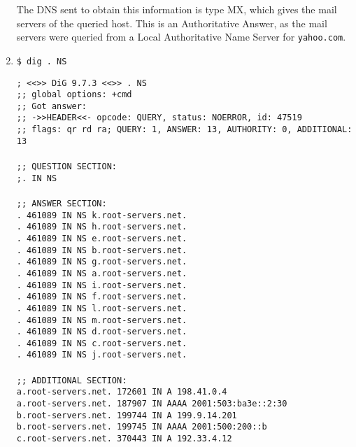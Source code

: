 \documentclass[a4paper,11pt]{article}
\newcommand{\code}{\texttt}
\begin{document}
\begin{enumerate}[leftmargin=*]
	The DNS sent to obtain this information is type MX, which gives the mail servers of the queried host. This is an Authoritative Answer, as the mail servers were queried from a Local Authoritative Name Server for \code{yahoo.com}.

	\item \code{\$ dig . NS}

	\code{; <<>> DiG 9.7.3 <<>> . NS\\
	;; global options: +cmd\\
	;; Got answer:\\
	;; ->>HEADER<<- opcode: QUERY, status: NOERROR, id: 47519\\
	;; flags: qr rd ra; QUERY: 1, ANSWER: 13, AUTHORITY: 0, ADDITIONAL: 13\\
	\\
	;; QUESTION SECTION:\\
	;.				IN	NS\\
	\\
	;; ANSWER SECTION:\\
	.			461089	IN	NS	k.root-servers.net.\\
	.			461089	IN	NS	h.root-servers.net.\\
	.			461089	IN	NS	e.root-servers.net.\\
	.			461089	IN	NS	b.root-servers.net.\\
	.			461089	IN	NS	g.root-servers.net.\\
	.			461089	IN	NS	a.root-servers.net.\\
	.			461089	IN	NS	i.root-servers.net.\\
	.			461089	IN	NS	f.root-servers.net.\\
	.			461089	IN	NS	l.root-servers.net.\\
	.			461089	IN	NS	m.root-servers.net.\\
	.			461089	IN	NS	d.root-servers.net.\\
	.			461089	IN	NS	c.root-servers.net.\\
	.			461089	IN	NS	j.root-servers.net.\\
	\\
	;; ADDITIONAL SECTION:\\
	a.root-servers.net.	172601	IN	A	198.41.0.4\\
	a.root-servers.net.	187907	IN	AAAA	2001:503:ba3e::2:30\\
	b.root-servers.net.	199744	IN	A	199.9.14.201\\
	b.root-servers.net.	199745	IN	AAAA	2001:500:200::b\\
	c.root-servers.net.	370443	IN	A	192.33.4.12\\
}
\end{enumerate}
\end{document}
